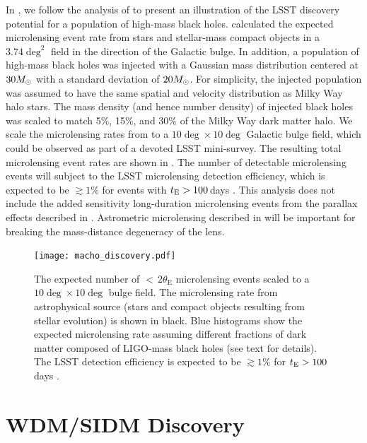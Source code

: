 In , we follow the analysis of \citet{Lu:2019} to present an illustration of the LSST discovery potential for a population of high-mass black holes.
\citet{Lu:2019} calculated the expected microlensing event rate from stars and stellar-mass compact objects in a $3.74 \deg^2$ field in the direction of the Galactic bulge.
In addition, a population of high-mass black holes was injected with a Gaussian mass distribution centered at $30M_\odot$ with a standard deviation of $20M_\odot$.
For simplicity, the injected population was assumed to have the same spatial and velocity distribution as Milky Way halo stars.
The mass density (and hence number density) of injected black holes was scaled to match 5\%, 15\%, and 30\% of the Milky Way dark matter halo.
We scale the microlensing rates from \citet{Lu:2019} to a $10\deg \times 10\deg$ Galactic bulge field, which could be observed as part of a devoted LSST mini-survey.
The resulting total microlensing event rates are shown in .
The number of detectable microlensing events will subject to the LSST microlensing detection efficiency, which is expected to be $\gtrsim 1\%$ for events with $t_{\rm E} > 100$\,days \citep{Lu:2019}.
This analysis does not include the added sensitivity long-duration microlensing events from the parallax effects described in . 
Astrometric microlensing described in  will be important for breaking the mass-distance degeneracy of the lens.

\begin{figure}[t]
\centering
\texttt{[image: macho\_discovery.pdf]}
\caption{\label{fig:macho_discovery}
  The expected number of $<\,2\theta_\mathrm{E}$ microlensing events scaled to a $10 \deg \times 10 \deg$ bulge field.
  The microlensing rate from astrophysical source (stars and compact objects resulting from stellar evolution) is shown in black.
  Blue histograms show the expected microlensing rate assuming different fractions of dark matter composed of LIGO-mass black holes (see text for details).
 The LSST detection efficiency is expected to be $\gtrsim 1\%$ for $t_{\rm E} > 100$\,days \citep[see][for details]{Lu:2019}.
}
\end{figure}

\section{WDM/SIDM Discovery}
\label{sec:wdm_sidm_discovery}

